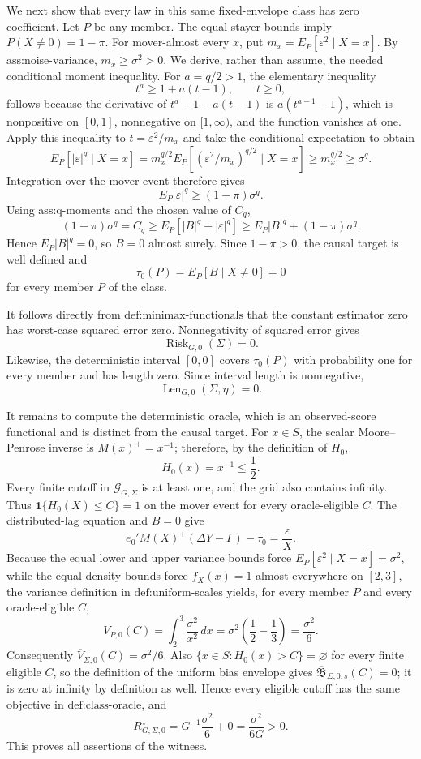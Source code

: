 We next show that every law in this same fixed-envelope class has zero coefficient. Let \(P\) be any member. The equal stayer bounds imply \(P(X\ne0)=1-\pi\). For mover-almost every \(x\), put \(m_x=E_P[\varepsilon^2\mid X=x]\). By \(\text{ass:noise-variance}\), \(m_x\ge\sigma^2>0\). We derive, rather than assume, the needed conditional moment inequality. For \(a=q/2>1\), the elementary inequality
\[
 t^a\ge 1+a(t-1),\qquad t\ge0,
\]
follows because the derivative of \(t^a-1-a(t-1)\) is \(a(t^{a-1}-1)\), which is nonpositive on \([0,1]\), nonnegative on \([1,\infty)\), and the function vanishes at one. Apply this inequality to \(t=\varepsilon^2/m_x\) and take the conditional expectation to obtain
\[
 E_P[|\varepsilon|^q\mid X=x]
 =m_x^{q/2}E_P[(\varepsilon^2/m_x)^{q/2}\mid X=x]
 \ge m_x^{q/2}
 \ge\sigma^q.
\]
Integration over the mover event therefore gives
\[
 E_P|\varepsilon|^q\ge(1-\pi)\sigma^q.
\]
Using \(\text{ass:q-moments}\) and the chosen value of \(C_q\),
\[
 (1-\pi)\sigma^q=C_q
 \ge E_P[|B|^q+|\varepsilon|^q]
 \ge E_P|B|^q+(1-\pi)\sigma^q.
\]
Hence \(E_P|B|^q=0\), so \(B=0\) almost surely. Since \(1-\pi>0\), the causal target is well defined and
\[
 \tau_0(P)=E_P[B\mid X\ne0]=0
\]
for every member \(P\) of the class.

It follows directly from \(\text{def:minimax-functionals}\) that the constant estimator zero has worst-case squared error zero. Nonnegativity of squared error gives
\[
 \operatorname{Risk}_{G,0}(\Sigma)=0.
\]
Likewise, the deterministic interval \([0,0]\) covers \(\tau_0(P)\) with probability one for every member and has length zero. Since interval length is nonnegative,
\[
 \operatorname{Len}_{G,0}(\Sigma,\eta)=0.
\]

It remains to compute the deterministic oracle, which is an observed-score functional and is distinct from the causal target. For \(x\in S\), the scalar Moore--Penrose inverse is \(M(x)^+=x^{-1}\); therefore, by the definition of \(H_0\),
\[
 H_0(x)=x^{-1}\le\frac12.
\]
Every finite cutoff in \(\mathcal G_{G,\Sigma}\) is at least one, and the grid also contains infinity. Thus \(\mathbf 1\{H_0(X)\le C\}=1\) on the mover event for every oracle-eligible \(C\). The distributed-lag equation and \(B=0\) give
\[
 e_0'M(X)^+(\Delta Y-\Gamma)-\tau_0
 =\frac{\varepsilon}{X}.
\]
Because the equal lower and upper variance bounds force \(E_P[\varepsilon^2\mid X=x]=\sigma^2\), while the equal density bounds force \(f_X(x)=1\) almost everywhere on \([2,3]\), the variance definition in \(\text{def:uniform-scales}\) yields, for every member \(P\) and every oracle-eligible \(C\),
\[
 V_{P,0}(C)
 =\int_2^3\frac{\sigma^2}{x^2}\,dx
 =\sigma^2\left(\frac12-\frac13\right)
 =\frac{\sigma^2}{6}.
\]
Consequently \(\overline V_{\Sigma,0}(C)=\sigma^2/6\). Also \(\{x\in S:H_0(x)>C\}=\varnothing\) for every finite eligible \(C\), so the definition of the uniform bias envelope gives \(\overline{\mathfrak B}_{\Sigma,0,s}(C)=0\); it is zero at infinity by definition as well. Hence every eligible cutoff has the same objective in \(\text{def:class-oracle}\), and
\[
 R_{G,\Sigma,0}^{\star}
 =G^{-1}\frac{\sigma^2}{6}+0
 =\frac{\sigma^2}{6G}>0.
\]
This proves all assertions of the witness.
